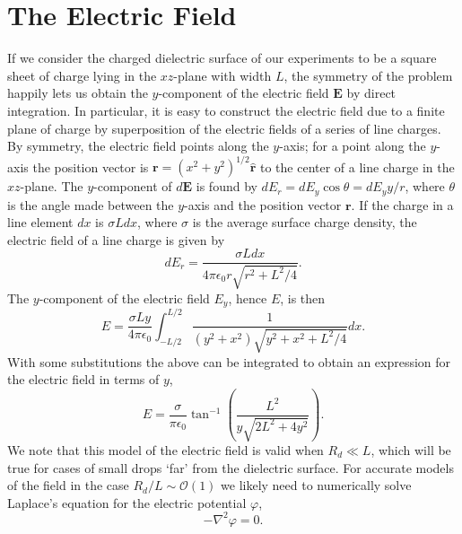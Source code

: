 \documentclass[12pt,a4paper,oneside]{book}
\begin{document}
\section{The Electric Field}
If we consider the charged dielectric surface of our experiments to be a square sheet of charge lying in the $xz$-plane with width $L$, the symmetry of the problem happily lets us obtain the $y$-component of the electric field $\mathbf{E}$ by direct integration. In particular, it is easy to construct the electric field due to a finite plane of charge by superposition of the electric fields of a series of line charges. By symmetry, the electric field points along the $y$-axis; for a point along the $y$-axis the position vector is $\mathbf{r} = \left( x^2 + y^2 \right)^{1/2} \hat{\mathbf{r}}$ to the center of a line charge in the $xz$-plane. The $y$-component of $d\mathbf{E}$ is found by $d E_r = d E_y \cos \theta = d E_y y/ r$, where $\theta$ is the angle made between the $y$-axis and the position vector $\mathbf{r}$. If the charge in a line element $dx$ is $\sigma L dx$, where $\sigma$ is the average surface charge density, the electric field of a line charge is given by \cite{david_j._griffiths_introduction_1999}
\[d E_r = \frac{\sigma L dx}{4 \pi \epsilon_0 r \sqrt{r^2 + L^2/4}}.
\]
The $y$-component of the electric field $E_y$, hence $E$, is then
\[ E = \frac{\sigma L y }{4 \pi \epsilon_0} \int^{L/2}_{-L/2} \frac{1}{(y^2 + x^2) \sqrt{y^2 + x^2 + L^2/4}} dx 
.\]
With some substitutions the above can be integrated to obtain an expression for the electric field in terms of $y$, 
\begin{equation}
\label{e_field}
E = \frac{\sigma}{ \pi \epsilon_0} \tan^{-1} \left( \frac{L^2}{y \sqrt{2L^2 + 4y^2}}\right)
.\end{equation}
We note that this model of the electric field is valid when $R_d \ll L$, which will be true for cases of small drops `far' from the dielectric surface. For accurate models of the field in the case $R_d/L \sim \mathcal{O}(1)$ we likely need to numerically solve Laplace's equation for the electric potential $\varphi$,
\[ - \nabla^2 \varphi = 0.\]
\end{document}
